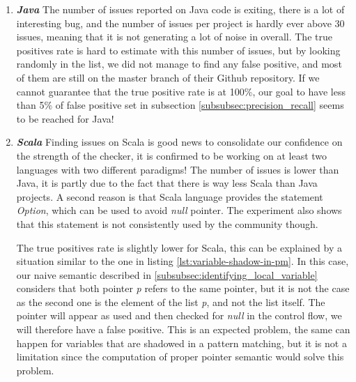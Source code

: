 \begin{enumerate}
	\item \textbf{\textit{Java}} \newline
	The number of issues reported on Java code is exiting, there is a lot of interesting bug, and the number of issues per project is hardly ever above 30 issues, meaning that it is not generating a lot of noise in overall.
	The true positives rate is hard to estimate with this number of issues, but by looking randomly in the list, we did not manage to find any false positive, and most of them are still on the master branch of their Github repository. 
	If we cannot guarantee that the true positive rate is at 100\%, our goal to have less than 5\% of false positive set in subsection \ref{subsubsec:precision_recall} seems to be reached for Java!
    \newline
	\item \textbf{\textit{Scala}} \newline
	Finding issues on Scala is good news to consolidate our confidence on the strength of the checker, it is confirmed to be working on at least two languages with two different paradigms!
	The number of issues is lower than Java, it is partly due to the fact that there is way less Scala than Java projects.
	A second reason is that Scala language provides the statement \emph{Option}, which can be used to avoid \emph{null} pointer.
	The experiment also shows that this statement is not consistently used by the community though.
	
	
	
	The true positives rate is slightly lower for Scala, this can be explained by a situation similar to the one in listing \ref{lst:variable-shadow-in-pm}. 
	In this case, our naive semantic described in \ref{subsubsec:identifying_local_variable} considers that both pointer \emph{p} refers to the same pointer, but it is not the case as the second one is the element of the list \emph{p}, and not the list itself.
	The pointer will appear as used and then checked for \emph{null} in the control flow, we will therefore have a false positive.
	This is an expected problem, the same can happen for variables that are shadowed in a pattern matching, but it is not a limitation since the computation of proper pointer semantic would solve this problem.
	

\end{enumerate}
